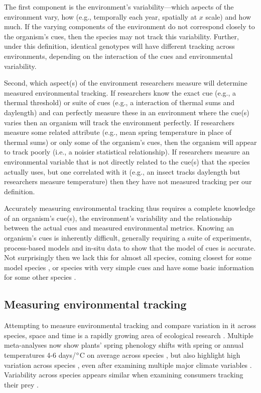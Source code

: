 \documentclass[11pt,letterpaper]{article}
\begin{document}
The first component is the environment's variability---which aspects of the environment vary, how (e.g., temporally each year, spatially at $x$ scale) and how much. If the varying components of the environment do not correspond closely to the organism's cues, then the species may not track this variability. Further, under this definition, identical genotypes will have different tracking across environments, depending on the interaction of the cues and environmental variability.

Second, which aspect(s) of the environment researchers measure will determine measured environmental tracking. If researchers know the exact cue (e.g., a thermal threshold) or suite of cues (e.g., a interaction of thermal sums and daylength) and can perfectly measure these in an environment where the cue(s) varies then an organism will track the environment perfectly. If researchers measure some related attribute (e.g., mean spring temperature in place of thermal sums) or only some of the organism's cues, then the organism will appear to track poorly (i.e., a noisier statistical relationship).  If researchers measure an environmental variable that is not directly related to the cue(s) that the species actually uses, but one correlated with it (e.g., an insect tracks daylength but researchers measure temperature) then they have not measured tracking per our definition.

Accurately measuring environmental tracking thus requires a complete knowledge of an organism's cue(s), the environment's variability and the relationship between the actual cues and measured environmental metrics. Knowing an organism's cues is inherently difficult, generally requiring a suite of experiments, process-based models and in-situ data to show that the model of cues is accurate. Not surprisingly then we lack this for almost all species, coming closest for some model species \citep[e.g., \emph{Arabidopsis thaliana},][]{Kingsolver2007,Wilczek:2009oa}, or species with very simple cues \citep[e.g., coral \emph{Acropora millepora},][]{levy2007} and have some basic information for some other species \citep[e.g., the Great Tit, \emph{Parus major},][]{charm2008}. 

\subsection{Measuring environmental tracking}
Attempting to measure environmental tracking and compare variation in it across species, space and time is a rapidly growing area of ecological research \citep[e.g.,][]{Cook:2012pnas,fu2015,thackeray2016,cohen2018}. Multiple meta-analyses now show plants' spring phenology shifts with spring or annual temperatures 4-6 days/$\degree$C on average across species \citep{Richardson:2006qh,Wolkovich:2012n,thackeray2016}, but also highlight high variation across species  \citep{Cook:2012pnas}, even after examining multiple major climate variables \citep{thackeray2016}. Variability across species appears similar when examining consumers tracking their prey \citep[across diverse species tracking over time is 6.1 days/decade but ranges from zero to 15 days/decade, see][]{kharouba2018}. 
\end{document}

